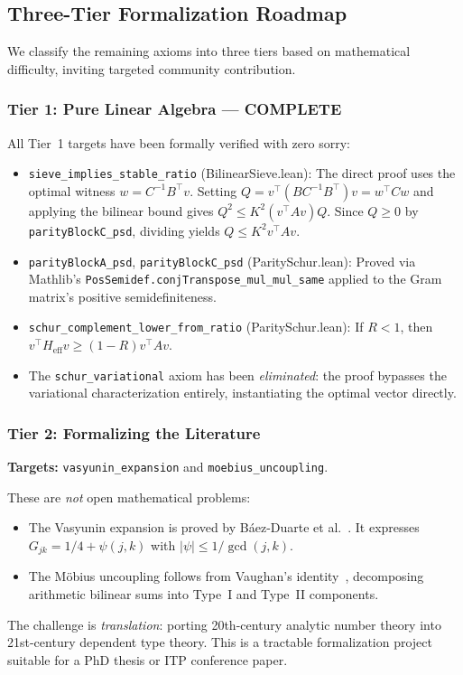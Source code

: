 \documentclass[11pt,a4paper]{article}
\theoremstyle{definition}
\theoremstyle{remark}
\newcommand{\lean}[1]{\texttt{#1}}
\begin{document}
\subsection{Three-Tier Formalization Roadmap}\label{sec:tiers}

We classify the remaining axioms into three tiers based on
mathematical difficulty, inviting targeted community contribution.

\subsubsection*{Tier 1: Pure Linear Algebra --- \textbf{COMPLETE}}

All Tier~1 targets have been formally verified with zero sorry:

\begin{itemize}
  \item \lean{sieve\_implies\_stable\_ratio} (BilinearSieve.lean):
    The direct proof uses the optimal witness $w = C^{-1}B^\top v$.
    Setting $Q = v^\top(BC^{-1}B^\top)v = w^\top C w$ and applying
    the bilinear bound gives $Q^2 \leq K^2 (v^\top Av) Q$. Since
    $Q \geq 0$ by \lean{parityBlockC\_psd}, dividing yields $Q \leq K^2 v^\top Av$.

  \item \lean{parityBlockA\_psd}, \lean{parityBlockC\_psd} (ParitySchur.lean):
    Proved via Mathlib's \lean{PosSemidef.conjTranspose\_mul\_mul\_same}
    applied to the Gram matrix's positive semidefiniteness.

  \item \lean{schur\_complement\_lower\_from\_ratio} (ParitySchur.lean):
    If $R < 1$, then $v^\top H_{\mathrm{eff}} v \geq (1-R) v^\top Av$.

  \item The \lean{schur\_variational} axiom has been \emph{eliminated}:
    the proof bypasses the variational characterization entirely,
    instantiating the optimal vector directly.
\end{itemize}

\subsubsection*{Tier 2: Formalizing the Literature}

\textbf{Targets:} \lean{vasyunin\_expansion} and
\lean{moebius\_uncoupling}.

These are \emph{not} open mathematical problems:
\begin{itemize}
  \item The Vasyunin expansion is proved by B\'aez-Duarte et
    al.~\cite{baez-duarte2005}. It expresses
    $G_{jk} = 1/4 + \psi(j,k)$ with $|\psi| \leq 1/\gcd(j,k)$.
  \item The M\"obius uncoupling follows from Vaughan's
    identity~\cite{vaughan77}, decomposing arithmetic bilinear sums
    into Type~I and Type~II components.
\end{itemize}
The challenge is \emph{translation}: porting 20th-century analytic
number theory into 21st-century dependent type theory. This is a
tractable formalization project suitable for a PhD thesis or ITP
conference paper.
\end{document}
